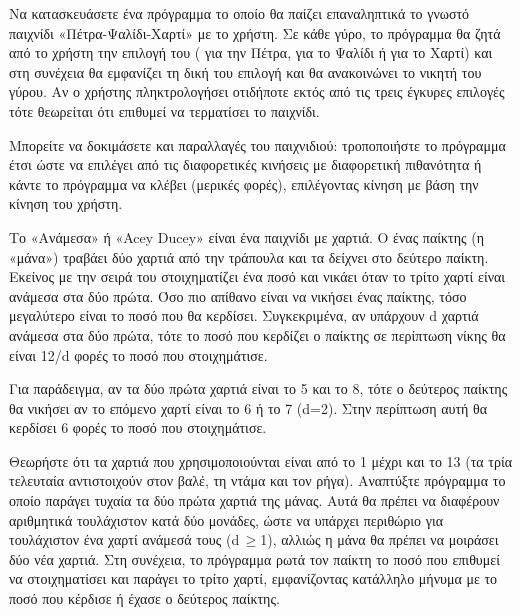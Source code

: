 \documentclass[a4paper,11pt,oneside]{book}
\begin{document}
\begin{exercise}
Να κατασκευάσετε ένα πρόγραμμα το οποίο θα παίζει επαναληπτικά το γνωστό παιχνίδι «Πέτρα-Ψαλίδι-Χαρτί» με το χρήστη. Σε κάθε γύρο, το πρόγραμμα θα ζητά από το χρήστη την επιλογή του ( για την Πέτρα,  για το Ψαλίδι ή  για το Χαρτί) και στη συνέχεια θα εμφανίζει τη δική του επιλογή και θα ανακοινώνει το νικητή του γύρου. Αν ο χρήστης πληκτρολογήσει οτιδήποτε εκτός από τις τρεις έγκυρες επιλογές τότε θεωρείται ότι επιθυμεί να τερματίσει το παιχνίδι. 

Μπορείτε να δοκιμάσετε και παραλλαγές του παιχνιδιού: τροποποιήστε το πρόγραμμα έτσι ώστε να επιλέγει από τις διαφορετικές κινήσεις με διαφορετική πιθανότητα ή κάντε το πρόγραμμα να κλέβει (μερικές φορές), επιλέγοντας κίνηση με βάση την κίνηση του χρήστη.
\end{exercise}

\begin{exercise}
Το «Ανάμεσα» ή «Acey Ducey» είναι ένα παιχνίδι με χαρτιά. Ο ένας παίκτης (η «μάνα») τραβάει δύο χαρτιά από την τράπουλα και τα δείχνει στο δεύτερο παίκτη. Εκείνος με την σειρά του στοιχηματίζει ένα ποσό και νικάει όταν το τρίτο χαρτί είναι ανάμεσα στα δύο πρώτα. Όσο πιο απίθανο είναι να νικήσει ένας παίκτης, τόσο μεγαλύτερο είναι το ποσό που θα κερδίσει. Συγκεκριμένα, αν υπάρχουν d χαρτιά ανάμεσα στα δύο πρώτα, τότε το ποσό που κερδίζει ο παίκτης σε περίπτωση νίκης θα είναι 12/d φορές το ποσό που στοιχημάτισε.

\begin{note}
Για παράδειγμα, αν τα δύο πρώτα χαρτιά είναι το 5 και το 8, τότε ο δεύτερος παίκτης θα νικήσει αν το επόμενο χαρτί είναι το 6 ή το 7 (d=2). Στην περίπτωση αυτή θα κερδίσει 6 φορές το ποσό που στοιχημάτισε.
\end{note}

Θεωρήστε ότι τα χαρτιά που χρησιμοποιούνται είναι από το 1 μέχρι και το 13 (τα τρία τελευταία αντιστοιχούν στον βαλέ, τη ντάμα και τον ρήγα). Αναπτύξτε πρόγραμμα το οποίο παράγει τυχαία τα δύο πρώτα χαρτιά της μάνας. Αυτά θα πρέπει να διαφέρουν αριθμητικά τουλάχιστον κατά δύο μονάδες, ώστε να υπάρχει περιθώριο για τουλάχιστον ένα χαρτί ανάμεσά τους (d\,$\geq$1), αλλιώς η μάνα θα πρέπει να μοιράσει δύο νέα χαρτιά. Στη συνέχεια, το πρόγραμμα ρωτά τον παίκτη το ποσό που επιθυμεί να στοιχηματίσει και παράγει το τρίτο χαρτί, εμφανίζοντας κατάλληλο μήνυμα με το ποσό που κέρδισε ή έχασε ο δεύτερος παίκτης.
\end{exercise}
\end{document}

